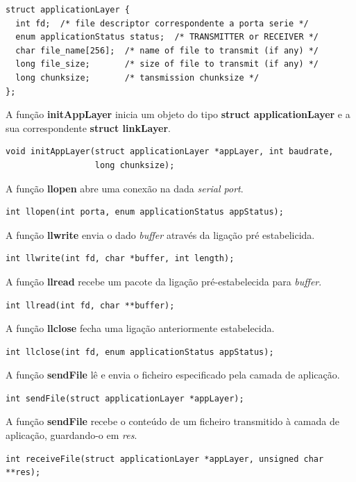 \documentclass[11pt]{report}
\begin{document}
\begin{lstlisting}
struct applicationLayer {
  int fd;  /* file descriptor correspondente a porta serie */
  enum applicationStatus status;  /* TRANSMITTER or RECEIVER */
  char file_name[256];  /* name of file to transmit (if any) */
  long file_size;       /* size of file to transmit (if any) */
  long chunksize;       /* tansmission chunksize */
};
\end{lstlisting}

A função \textbf{initAppLayer} inicia um objeto do tipo \textbf{struct applicationLayer}
e a sua correspondente \textbf{struct linkLayer}.
\begin{lstlisting}
void initAppLayer(struct applicationLayer *appLayer, int baudrate,
                  long chunksize);
\end{lstlisting}

A função \textbf{llopen} abre uma conexão na dada \textit{serial port}.
\begin{lstlisting}
int llopen(int porta, enum applicationStatus appStatus);
\end{lstlisting}

A função \textbf{llwrite} envia o dado \textit{buffer} através da ligação pré estabelicida.
\begin{lstlisting}
int llwrite(int fd, char *buffer, int length);
\end{lstlisting}

A função \textbf{llread} recebe um pacote da ligação pré-estabelecida para \textit{buffer}.
\begin{lstlisting}
int llread(int fd, char **buffer);
\end{lstlisting}

A função \textbf{llclose} fecha uma ligação anteriormente estabelecida.
\begin{lstlisting}
int llclose(int fd, enum applicationStatus appStatus);
\end{lstlisting}

A função \textbf{sendFile} lê e envia o ficheiro especificado pela camada de aplicação.
\begin{lstlisting}
int sendFile(struct applicationLayer *appLayer);
\end{lstlisting}

A função \textbf{sendFile} recebe o conteúdo de um ficheiro transmitido à camada de aplicação,
guardando-o em \textit{res}.
\begin{lstlisting}
int receiveFile(struct applicationLayer *appLayer, unsigned char **res);
\end{lstlisting}
\end{document}
